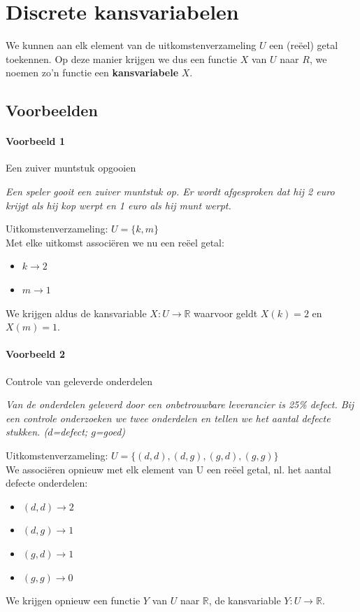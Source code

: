 \documentclass[12pt,twoside]{article}
\begin{document}
\thispagestyle{empty}
\mbox{}
\newpage
\clearpage
\thispagestyle{empty}
\mbox{}
\newpage
\clearpage
{} 

\fancyhead[RE,LO]{}

\section{Discrete kansvariabelen}

\vspace*{-0.5cm}
We kunnen aan elk element van de uitkomstenverzameling $U$ een (reëel) getal toekennen. Op deze manier krijgen we dus een functie $X$ van $U$ naar $R$, we noemen zo'n functie een {\bf kansvariabele} $X$.

\vspace*{-0.5cm}
\subsection{Voorbeelden}

\vspace*{-0.5cm}
\paragraph*{Voorbeeld 1} Een zuiver muntstuk opgooien

{\em Een speler gooit een zuiver muntstuk op. Er wordt afgesproken dat hij 2 euro krijgt als hij kop werpt en 1 euro als hij munt werpt.}

Uitkomstenverzameling: $U=\{k, m\}$\\
Met elke uitkomst associëren we nu een reëel getal:
\begin{itemize}
  \item $k \to 2$
  \item $m \to 1$
\end{itemize}
We krijgen aldus de kansvariable $X:U\to\mathbb{R}$ waarvoor geldt $X(k)=2$ en $X(m)=1$.

\paragraph*{Voorbeeld 2} Controle van geleverde onderdelen

{\em Van de onderdelen geleverd door een onbetrouwbare leverancier is 25\% defect. Bij een controle onderzoeken we twee onderdelen en tellen we het aantal defecte stukken. ($d$=defect; $g$=goed)}

Uitkomstenverzameling: $U=\{(d,d), (d,g), (g,d), (g,g)\}$\\
We associëren opnieuw met elk element van U een reëel getal, nl. het aantal defecte onderdelen:
\begin{itemize}
  \item $(d,d) \to 2$
  \item $(d,g) \to 1$
  \item $(g,d) \to 1$
  \item $(g,g) \to 0$
\end{itemize}
We krijgen opnieuw een functie $Y$ van $U$ naar $\mathbb{R}$, de kansvariable $Y:U\to\mathbb{R}$.
\end{document}
